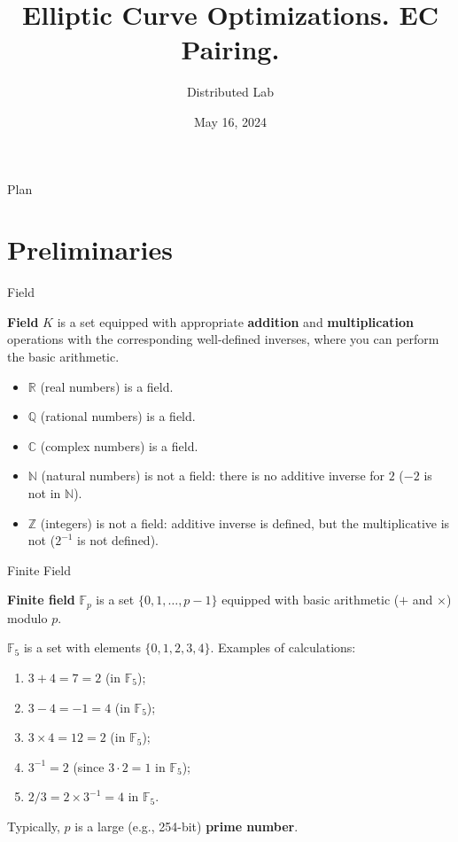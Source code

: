 \documentclass[xcolor={usenames,dvipsnames}]{beamer}
\title[Elliptic Curves]{\textbf{Elliptic Curve Optimizations. EC Pairing.}}
\author{Distributed Lab\vspace{-2em}}
\date{May 16, 2024}
\begin{document}
	\frame {
		\titlepage
	}
 
	\begin{frame}{Plan}
        \tableofcontents
    \end{frame}

	\section{Preliminaries}
    \begin{frame}{Field}
        \begin{definition}{}
            \textbf{Field} $K$ is a set equipped with appropriate \textbf{addition} and \textbf{multiplication} operations with the corresponding well-defined inverses, where you can perform the basic arithmetic.
        \end{definition}
        \pause
        \begin{exampleblock}{}
            \begin{itemize}
                \item $\mathbb{R}$ (real numbers) is a field.\pause
                \item $\mathbb{Q}$ (rational numbers) is a field.\pause
                \item $\mathbb{C}$ (complex numbers) is a field.\pause
                \item $\mathbb{N}$ (natural numbers) is not a field: there is no additive inverse for $2$ ($-2$ is not in $\mathbb{N}$).\pause
                \item $\mathbb{Z}$ (integers) is not a field: additive inverse is defined, but the multiplicative is not ($2^{-1}$ is not defined).
            \end{itemize}
        \end{exampleblock}
    \end{frame}
 
	\begin{frame}{Finite Field}	
		\begin{definition}{}
		    \textbf{Finite field} $\mathbb{F}_p$ is a set $\{0,1,\dots,p-1\}$ equipped with basic arithmetic ($+$ and $\times$) modulo $p$.
		\end{definition}
        \pause
        \begin{example}
            $\mathbb{F}_5$ is a set with elements $\{0,1,2,3,4\}$. Examples of calculations:
            \begin{enumerate}
                \item $3 + 4 = 7 = 2$ (in $\mathbb{F}_5$);
                \item $3 - 4 = -1 = 4$ (in $\mathbb{F}_5$);
                \item $3 \times 4 = 12 = 2$ (in $\mathbb{F}_5$);
                \item $3^{-1} = 2$ (since $3 \cdot 2 = 1$ in $\mathbb{F}_5$);
                \item $2/3 = 2 \times 3^{-1} = 4$ in $\mathbb{F}_5$.
            \end{enumerate}
        \end{example}

        Typically, $p$ is a large (e.g., 254-bit) \textbf{prime number}.
	\end{frame}
\end{document}
